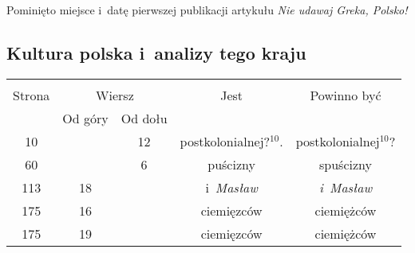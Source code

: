 \documentclass[a4paper,11pt]{article}
\begin{document}
\vspace{\spaceTwo}








\start {} Pominięto miejsce i~datę pierwszej publikacji
artykułu \emph{Nie udawaj Greka, Polsko!}





\subsection{Kultura polska i~analizy tego kraju}

\vspace{\spaceThree}






\begin{center}
  \begin{tabular}{|c|c|c|c|c|}
    \hline
    & \multicolumn{2}{c|}{} & & \\
    Strona & \multicolumn{2}{c|}{Wiersz} & Jest
                              & Powinno być \\ \cline{2-3}
    & Od góry & Od dołu & & \\
    \hline
    10  & & 12 & postkolonialnej?$^{ 10 }$. & postkolonialnej$^{ 10 }$? \\
    60  & &  6 & puścizny & spuścizny \\
    113 & 18 & & i~\emph{Masław} & \emph{i~Masław} \\
    175 & 16 & & ciemięzców & ciemiężców \\
    175 & 19 & & ciemięzców & ciemiężców \\
    \hline
  \end{tabular}
\end{center}
\end{document}
